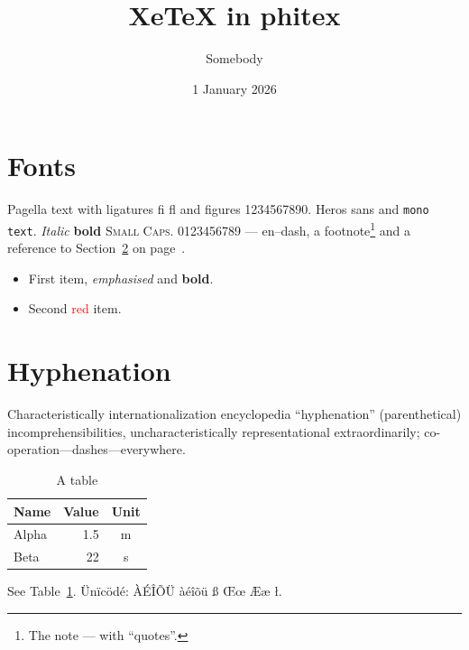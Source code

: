 \documentclass[11pt]{article}
\title{XeTeX in phitex}\author{Somebody}\date{1 January 2026}
\begin{document}
\maketitle
\tableofcontents
\section{Fonts}\label{sec:a}
Pagella text with ligatures fi fl and figures 1234567890. \textsf{Heros sans}
and \texttt{mono text}. \textit{Italic} \textbf{bold} \textsc{Small Caps}.
{0123456789} --- en–dash, a footnote\footnote{The
note — with “quotes”.} and a reference to Section~\ref{sec:b} on page~\pageref{sec:b}.
\begin{itemize}
\item First item, \emph{emphasised} and \textbf{bold}.
\item Second \textcolor{red}{red} item.
\end{itemize}
\section{Hyphenation}\label{sec:b}
\parbox{4cm}{\termes Characteristically internationalization encyclopedia
``hyphenation'' (parenthetical) incomprehensibilities, uncharacteristically
representational extraordinarily; co-operation—dashes—everywhere.}
\begin{table}[h]\centering
\begin{tabular}{lrc}\toprule Name & Value & Unit\\\midrule Alpha & 1.5 & m\\ Beta & 22 & s\\\bottomrule\end{tabular}
\caption{A table}\label{tab:x}
\end{table}
See Table~\ref{tab:x}. Ünïcödé: ÀÉÎÕÜ àéîõü ß Œœ Ææ ł.
\end{document}
